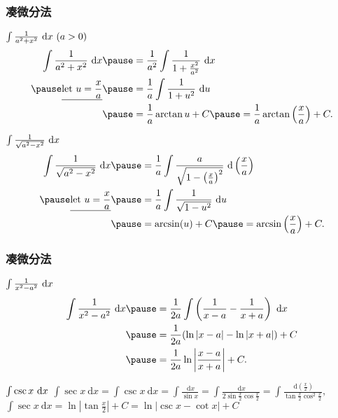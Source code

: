 \documentclass[
10pt,
aspectratio=43,
]{beamer}
\begin{document}
\begin{frame}
	\frametitle{凑微分法}
	\everymath{\displaystyle}
	{\small
		\begin{exampleblock}{$\color{black}\int \frac{1}{a^2+x^2} \mathrm{~d}x\,\,(a>0)$}
			$$
				\begin{aligned}
					\int \frac{1}{a^2+x^2} \mathrm{~d}x        & \pause = \frac{1}{a^2} \int \frac{1}{1+\frac{x^2}{a^2}} \mathrm{~d}x                     \\
					\pause\underline{\text{let }u=\frac{x}{a}} & \pause =  \frac{1}{a} \int \frac{1}{1+u^2} \mathrm{~d}u                                  \\
					                                           & \pause = \frac{1}{a} \arctan u+C \pause = \frac{1}{a} \arctan\left(\frac{x}{a}\right)+C.
				\end{aligned}
			$$
		\end{exampleblock}
		\pause
		\begin{exampleblock}{$\color{black}\int \frac{1}{\sqrt{a^2-x^2}} \mathrm{~d}x$}
			$$
				\begin{aligned}
					\int \frac{1}{\sqrt{a^2-x^2}} \mathrm{~d}x & \pause = \frac{1}{a} \int \frac{a}{\sqrt{1-\left(\frac{x}{a}\right)^2}} \mathrm{~d}\left(\frac{x}{a}\right) \\
					\pause\underline{\text{let }u=\frac{x}{a}} & \pause =  \frac{1}{a} \int \frac{1}{\sqrt{1-u^2}} \mathrm{~d}u                                              \\
					                                           & \pause = \arcsin(u)+C \pause = \arcsin\left(\frac{x}{a}\right)+C.
				\end{aligned}
			$$
		\end{exampleblock}
	}
\end{frame}


\begin{frame}
	\frametitle{凑微分法}
	\everymath{\displaystyle}
	\begin{exampleblock}{$\color{black}\int \frac{1}{x^2-a^2} \mathrm{~d}x$}
		$$
			\begin{aligned}
				\int \frac{1}{x^2-a^2} \mathrm{~d}x & \pause  = \frac{1}{2a} \int \left(\frac{1}{x-a}-\frac{1}{x+a}\right) \mathrm{~d}x \\
				                                    & \pause = \frac{1}{2a}(\ln |x-a|-\ln |x+a|)+C                                      \\
				                                    & \pause  = \frac{1}{2a} \ln \left|\frac{x-a}{x+a}\right|+C.
			\end{aligned}
		$$
	\end{exampleblock}
	\pause
	\begin{exampleblock}{$\color{black}\int \csc x \mathrm{~d}x$}
		$
			\int \sec x \mathrm{~d}x   = \int \csc x \mathrm{~d} x=\int \frac{\mathrm{~d} x}{\sin x}=\int \frac{\mathrm{~d} x}{2 \sin \frac{x}{2} \cos \frac{x}{2}}=\int \frac{\mathrm{~d}\left(\frac{x}{2}\right)}{\tan \frac{x}{2} \cos ^2 \frac{x}{2}},
		$\\
		$
			\int \sec x \mathrm{~d}x =\ln \left|\tan \frac{x}{2}\right|+C  =\ln |\csc x-\cot x|+C
		$
	\end{exampleblock}
\end{frame}
\end{document}
